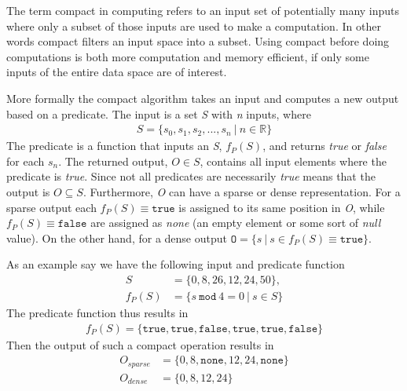 The term compact in computing refers to an input set of potentially many inputs where only a subset of those inputs are used to make a computation.
In other words compact filters an input space into a subset.
Using compact before doing computations is both more computation and memory efficient, if only some inputs of the entire data space are of interest.

More formally the compact algorithm takes an input and computes a new output based on a predicate.
The input is a set \textit{S} with \textit{n} inputs, where 
\begin{gather}
	S=\{s_{0}, s_{1}, s_{2}, ... , s_{n}\ |\ n\in \mathbb{R}\}
\end{gather}
The predicate is a function that inputs an \textit{S}, $f_{P}(S)$, and returns \textit{true} or \textit{false} for each $s_n$.
The returned output, $O\in S$, contains all input elements where the predicate is \textit{true}. 
Since not all predicates are necessarily \textit{true} means that the output is $O\subseteq S$.
Furthermore, \textit{O} can have a sparse or dense representation.
For a sparse output each $f_{P}(S)\equiv \mathtt{true}$ is assigned to its same position in \textit{O}, while $f_{P}(S)\equiv \mathtt{false}$ are assigned as \textit{none} (an empty element or some sort of \textit{null} value).
On the other hand, for a dense output $\mathtt{O}=\{s\ |\ s\in f_{P}(S)\equiv \mathtt{true}\}$.

\noindent As an example say we have the following input and predicate function
\begin{align}
	       S &= \{0, 8, 26, 12, 24, 50\}, \\
	f_{P}(S) &= \{s\ \mathtt{mod}\ 4 = 0\ |\ s\in S\}
\end{align}
The predicate function thus results in
\begin{gather}
	f_{P}(S)=\{\mathtt{true}, \mathtt{true}, \mathtt{false}, \mathtt{true}, \mathtt{true}, \mathtt{false}\}
\end{gather}
Then the output of such a compact operation results in
\begin{align}
	O_{sparse} &= \{0, 8, \mathtt{none}, 12, 24, \mathtt{none}\}\\
	O_{dense} &= \{0, 8, 12, 24\}
\end{align}

